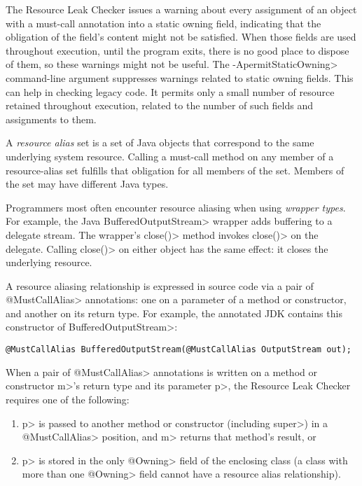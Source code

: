 \noindent
The Resource Leak Checker issues a warning about every assignment of an
object with a must-call annotation into a static owning field,
indicating that the obligation of the field's content might not be
satisfied.  When those fields are used throughout execution, until the
program exits, there is no good place to dispose of them, so these warnings
might not be useful.  The \<-ApermitStaticOwning> command-line argument
suppresses warnings related to static owning fields.  This can help in
checking legacy code.  It permits only a small number of resource retained
throughout execution, related to the number of such fields and assignments
to them.



A \emph{resource alias} set is a set of Java objects that
correspond to the same underlying system resource.
Calling a must-call method on any member of a resource-alias set
fulfills that obligation for all members of the set.
Members of the set may have different Java types.

Programmers most often encounter resource aliasing when using \emph{wrapper types}.
For example, the Java \<Buffered\-Output\-Stream> wrapper adds buffering to a
delegate stream.
The wrapper's \<close()> method invokes \<close()> on the delegate.  Calling
\<close()> on either object has the same effect:  it closes the underlying resource.

A resource aliasing relationship is expressed in source code via a pair of \<@MustCallAlias> annotations:
one on a parameter of a method or constructor, and another on its return type.
For example, the annotated JDK contains this constructor of \<BufferedOutputStream>:
\begin{Verbatim}
@MustCallAlias BufferedOutputStream(@MustCallAlias OutputStream out);
\end{Verbatim}

When a pair of \<@MustCallAlias> annotations is written on a method or constructor \<m>'s return type
and its parameter \<p>, the Resource Leak Checker requires one of the following:
\begin{enumerate}
\item \<p> is passed to another method or constructor (including \<super>) in a
  \<@MustCallAlias> position, and \<m> returns that method's result, or
\item \<p> is stored in the only \<@Owning> field of the enclosing class (a class with more than one
  \<@Owning> field cannot have a resource alias relationship).
\end{enumerate}

